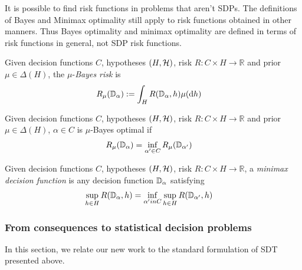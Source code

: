 It is possible to find risk functions in problems that aren't SDPs. The definitions of Bayes and Minimax optimality still apply to risk functions obtained in other manners. Thus Bayes optimality and minimax optimality are defined in terms of risk functions in general, not SDP risk functions.

\begin{definition}
Given decision functions $C$, hypotheses $(H,\mathcal{H})$, risk $R:C\times H\to \mathbb{R}$ and prior $\mu\in \Delta(H)$, the $\mu$-\emph{Bayes risk} is
\begin{align}
    R_\mu(\mathbb{D}_\alpha) &:= \int_{H} R(\mathbb{D}_\alpha,h)\mu(\mathrm{d}h)
\end{align}
\end{definition}

\begin{definition}
Given decision functions $C$, hypotheses $(H,\mathcal{H})$, risk $R:C\times H\to \mathbb{R}$ and prior $\mu\in \Delta(H)$, $\alpha\in C$ is $\mu$-Bayes optimal if
\begin{align}
    R_\mu(\mathbb{D}_\alpha) &= \inf_{\alpha'\in C} R_{\mu}(\mathbb{D}_{\alpha'})
\end{align}
\end{definition}

\begin{definition}
Given decision functions $C$, hypotheses $(H,\mathcal{H})$, risk $R:C\times H\to \mathbb{R}$, a \emph{minimax decision function} is any decision function $\mathbb{D}_\alpha$ satisfying
\begin{align}
    \sup_{h\in H}  R(\mathbb{D}_\alpha,h) &= \inf_{\alpha' in C} \sup_{h\in H} R(\mathbb{D}_{\alpha'},h)
\end{align}
\end{definition}

\subsubsection{From consequences to statistical decision problems}\label{sec:cons_to_sdp}

In this section, we relate our new work to the standard formulation of SDT presented above.

